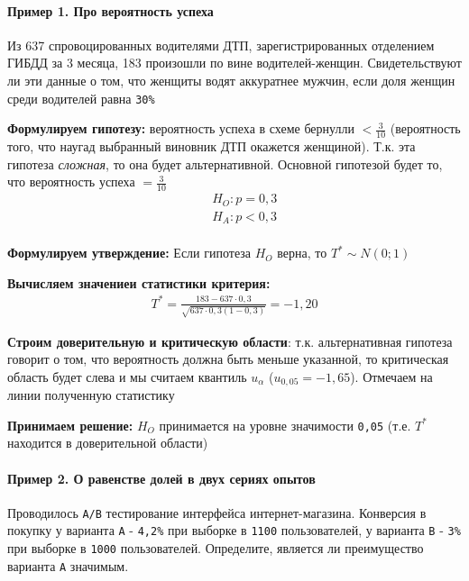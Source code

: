 \documentclass[12pt]{extarticle}
\begin{document}
\paragraph{Пример 1. Про вероятность успеха}
Из 637 спровоцированных водителями ДТП, зарегистрированных отделением
ГИБДД за 3 месяца, 183 произошли по вине водителей-женщин.
Свидетельствуют ли эти данные о том, что женщиты водят аккуратнее
мужчин, если доля женщин среди водителей равна \verb|30%|
\par \textbf{Формулируем гипотезу:} вероятность успеха в схеме бернулли $<
\frac{3}{10}$ (вероятность того, что наугад выбранный виновник ДТП
окажется женщиной). Т.к. эта гипотеза \textit{сложная}, то она будет
альтернативной. Основной гипотезой будет то, что вероятность успеха $=
\frac{3}{10}$
\begin{eqnarray*}
&&H_{O}:p=0,3\\
&&H_{A}:p<0,3\\
\end{eqnarray*}
\par \textbf{Формулируем утверждение:} Если гипотеза $H_{O}$ верна, то
$T^{*}\sim N(0;1)$
\par \textbf{Вычисляем значениеи статистики критерия:}
\begin{eqnarray*}
    T^{*}=\frac{183-637\cdot 0,3}{\sqrt{637\cdot 0,3(1-0,3)}}=-1,20
\end{eqnarray*}
\par \textbf{Строим доверительную и критическую области}: т.к.
альтернативная гипотеза говорит о том, что вероятность должна быть
меньше указанной, то критическая область будет слева и мы считаем
квантиль $u_{\alpha}$ ($u_{0,05}=-1,65$). Отмечаем на линии полученную
статистику
\par \textbf{Принимаем решение:} $H_{O}$ принимается на уровне
значимости \verb|0,05| (т.е. $T^{*}$ находится в доверительной области)

\paragraph{Пример 2. О равенстве долей в двух сериях опытов}
Проводилось \verb|A/B| тестирование интерфейса интернет-магазина.
Конверсия в покупку у варианта \verb|A| - \verb|4,2%| при выборке в
\verb|1100| пользователей, у варианта \verb|B| - \verb|3%| при выборке в
\verb|1000| пользователей. Определите, является ли преимущество варианта
\verb|A| значимым.
\end{document}
